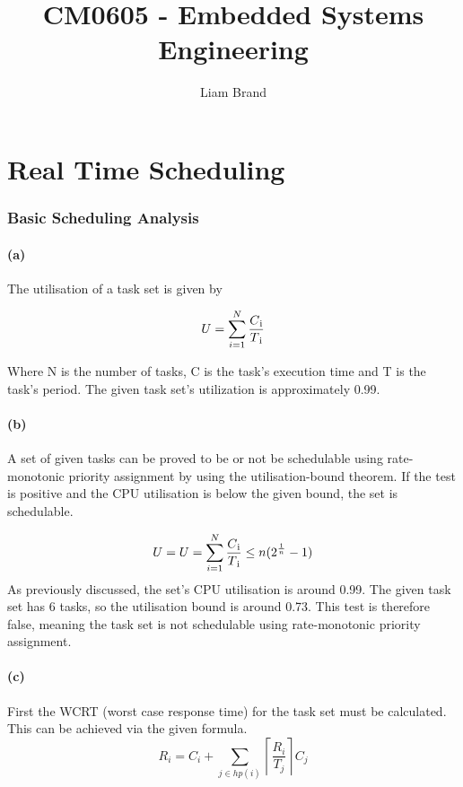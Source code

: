\documentclass[]{report}
\title{CM0605 - Embedded Systems Engineering}
\author{Liam Brand}
\date{}
\begin{document}
\maketitle
\tableofcontents

	\chapter{Real Time Scheduling}
		\subsection{Basic Scheduling Analysis}
			\subsubsection{(a)}
			The utilisation of a task set is given by
			
			\begin{equation}
				U = \sum_{i=1}^{N} \frac{C\textsubscript{i}}{T\textsubscript{i}}
			\end{equation}
			
			Where N is the number of tasks, C is the task's execution time and T is the task's period. The given task set's utilization is approximately 0.99.
			
			\subsubsection{(b)}
			A set of given tasks can be proved to be or not be schedulable using rate-monotonic priority assignment by using the utilisation-bound theorem. If the test is positive and the CPU utilisation is below the given bound, the set is schedulable.
			
			\begin{equation}
			U = U = \sum_{i=1}^{N} \frac{C\textsubscript{i}}{T\textsubscript{i}} \leq n(2^\frac{1}{n} - 1)
			\end{equation}
			As previously discussed, the set's CPU utilisation is around 0.99. The given task set has 6 tasks, so the utilisation bound is around 0.73. This test is therefore false, meaning the task set is not schedulable using rate-monotonic priority assignment.
			
			\subsubsection{(c)}
			First the WCRT (worst case response time) for the task set must be calculated. This can be achieved via the given formula.
			\begin{equation}
			R_i = C_i + \sum_{j \in hp(i)} \left\lceil \frac{R_i}{T_j} \right\rceil C_j
			\end{equation}
			
\end{document}
